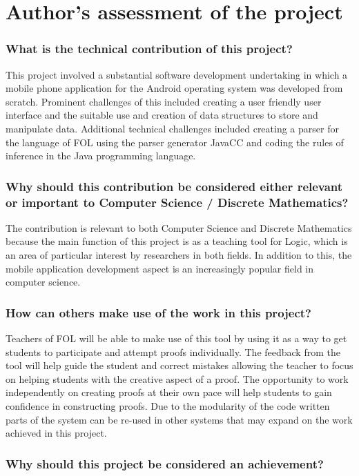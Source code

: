 \section{Author's assessment of the project}

\subsubsection*{What is the technical contribution of this project?}

\noindent This project involved a substantial software development undertaking in which a mobile phone application for the Android operating system was developed from scratch. Prominent challenges of this included creating a user friendly user interface and the suitable use and creation of data structures to store and manipulate data. Additional technical challenges included creating a parser for the language of FOL using the parser generator JavaCC  and coding the rules of inference in the Java programming language.
\subsubsection*{Why should this contribution be considered either relevant or important to Computer Science / Discrete Mathematics?}
The contribution is relevant to both Computer Science and Discrete Mathematics because the main function of this project is as a teaching tool for Logic, which is an area of particular interest by researchers in both fields.
In addition to this, the mobile application development aspect is an increasingly popular field in computer science.

\subsubsection*{How can others make use of the work in this project?}
Teachers of FOL will be able to make use of this tool by using it as a way to get students to participate and attempt proofs individually. The feedback from the tool will help guide the student and correct mistakes allowing the teacher to focus on helping students with the creative aspect of a proof. The opportunity to work independently on creating proofs at their own pace will help students to gain confidence in constructing proofs.
Due to the modularity of the code written parts of the system can be re-used in other systems that may expand on the work achieved in this project.

\subsubsection*{Why should this project be considered an achievement?}

